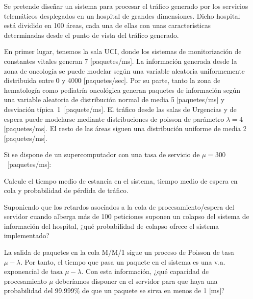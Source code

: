 \documentclass{assignment}
\date{\today}
\renewenvironment{answer}%
{%
\vspace{0.1 in}
\begin{boldmath}
\begin{emph}
{%
}
}%
{%
\end{emph}
\end{boldmath}
\begin{flushright}
\bfseries{$\longrightarrow \mathcal{S}$\sf{olución}}
\end{flushright}
}
\begin{document}
Se pretende diseñar un sistema para procesar el tráfico generado por los servicios telemáticos desplegados en un hospital de grandes dimensiones. Dicho hospital está dividido en 100 áreas, cada una de ellas con unas características determinadas desde el punto de vista del tráfico generado.

En primer lugar, tenemos la sala UCI, donde los sistemas de monitorización de constantes vitales generan 7 [paquetes/ms]. La información generada desde la zona de oncología se puede modelar según una variable aleatoria uniformemente distribuida entre 0 y 4000 [paquetes/sec]. Por su parte, tanto la zona de hematología como pediatría oncológica generan paquetes de información según una variable aleatoria de distribución normal de media 5 [paquetes/ms] y desviación típica~1~[paquete/ms]. El tráfico desde las salas de Urgencias y de espera puede modelarse mediante distribuciones de poisson de parámetro $\lambda=4$ [paquetes/ms]. El resto de las áreas siguen una distribución uniforme de media 2 [paquetes/ms]. 

Si se dispone de un
supercomputador con una tasa de servicio de
$\mu=300$~[paquetes/ms]:

\begin{problemlist}
    \pbitem Calcule el tiempo medio de estancia en el sistema, tiempo medio de espera en cola y probabilidad de pérdida de tráfico.


    \pbitem Suponiendo que los retardos asociados a la cola de procesamiento/espera del servidor cuando alberga más de 100 peticiones suponen un colapso del sistema de información del hospital, ¿qué probabilidad de colapso ofrece el sistema implementado?



    \pbitem La salida de paquetes en la cola M/M/1 sigue un proceso de Poisson de tasa $\mu-\lambda$. Por tanto, el tiempo que pasa un paquete en el sistema es una v.a. exponencial de tasa $\mu-\lambda$. Con esta información, ¿qué capacidad de procesamiento $\mu$ deberíamos disponer en el servidor para que haya una probabilidad del 99.999\% de que un paquete se sirva en menos de 1 [ms]?

\end{problemlist}
\end{document}

